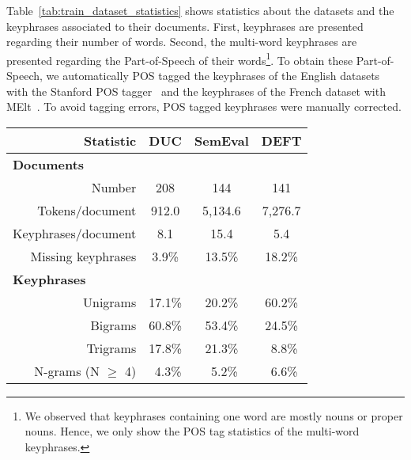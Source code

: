     Table~\ref{tab:train_dataset_statistics} shows statistics about the datasets
    and the keyphrases associated to their documents. First, keyphrases are presented
    regarding their number of words. Second, the multi-word keyphrases are
    presented regarding the Part-of-Speech of their words\footnote{We observed
    that keyphrases containing one word are mostly nouns or proper nouns. Hence,
    we only show the POS tag statistics of the multi-word keyphrases.}. To
    obtain these Part-of-Speech, we automatically POS tagged the keyphrases of
    the English datasets with the Stanford POS
    tagger~\cite{toutanova2003stanfordpostagger} and the keyphrases of the
    French dataset with MElt~\cite{denis2009melt}. To avoid tagging errors, POS
    tagged keyphrases were manually corrected. 
    \begin{table}
      \centering
      \begin{tabular}{lr|ccc}
        \toprule
        & \textbf{Statistic} & \textbf{DUC} & \textbf{SemEval} & \textbf{DEFT}\\
        \hline
        \multicolumn{2}{l|}{\textbf{Documents}}\\
        \multicolumn{2}{r|}{Number} & 208 & 144 & 141\\
        \multicolumn{2}{r|}{Tokens/document} & 912.0 & 5,134.6 & 7,276.7\\
        \multicolumn{2}{r|}{Keyphrases/document} & 8.1 & 15.4 & 5.4\\
        \multicolumn{2}{r|}{Missing keyphrases} & 3.9\% & 13.5\% & 18.2\%\\
        \hline
        \multicolumn{2}{l|}{\textbf{Keyphrases}}\\
        \multicolumn{2}{r|}{Unigrams} & 17.1\% & 20.2\% & 60.2\%\\
        \multicolumn{2}{r|}{Bigrams} & 60.8\% & 53.4\% & 24.5\%\\
        \multicolumn{2}{r|}{Trigrams} & 17.8\% & 21.3\% & $~~$8.8\%\\
        \multicolumn{2}{r|}{N-grams (N $\geq$ 4)} & $~~$4.3\% & $~~$5.2\% & $~~$6.6\%\\

\end{tabular}
\end{table}
